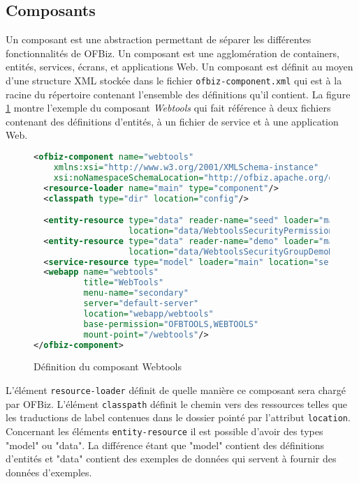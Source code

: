 \documentclass[a4paper, 11pt]{report}
\begin{document}
\subsection{Composants}

Un composant est une abstraction permettant de séparer les différentes
fonctionnalités de OFBiz. Un composant est une agglomération de
containers, entités, services, écrans, et applications Web. Un
composant est définit au moyen d'une structure XML stockée dans le
fichier \verb=ofbiz-component.xml= qui est à la racine du répertoire
contenant l'ensemble des définitions qu'il contient.  La figure
\ref{fig:ofbizcomponent} montre l'exemple du composant \emph{Webtools}
qui fait référence à deux fichiers contenant des définitions
d'entités, à un fichier de service et à une application Web.

\begin{figure}
  \begin{lstlisting}[language=xml]
<ofbiz-component name="webtools"
    xmlns:xsi="http://www.w3.org/2001/XMLSchema-instance"
    xsi:noNamespaceSchemaLocation="http://ofbiz.apache.org/dtds/ofbiz-component.xsd">
  <resource-loader name="main" type="component"/>
  <classpath type="dir" location="config"/>

  <entity-resource type="data" reader-name="seed" loader="main"
                   location="data/WebtoolsSecurityPermissionSeedData.xml"/>
  <entity-resource type="data" reader-name="demo" loader="main"
                   location="data/WebtoolsSecurityGroupDemoData.xml"/>
  <service-resource type="model" loader="main" location="servicedef/services.xml"/>
  <webapp name="webtools"
          title="WebTools"
          menu-name="secondary"
          server="default-server"
          location="webapp/webtools"
          base-permission="OFBTOOLS,WEBTOOLS"
          mount-point="/webtools"/>
</ofbiz-component>
  \end{lstlisting}
  \caption{Définition du composant Webtools}
  \label{fig:ofbizcomponent}
\end{figure}

L'élément \verb=resource-loader= définit de quelle manière ce
composant sera chargé par OFBiz. L'élément \verb=classpath= définit le
chemin vers des ressources telles que les traductions de label contenues
dans le dossier pointé par l'attribut \verb=location=. Concernant les
éléments \verb=entity-resource= il est possible d'avoir des types
"model" ou "data". La différence étant que "model" contient des
définitions d'entités et "data" contient des exemples de données qui
servent à fournir des données d'exemples.
\end{document}
